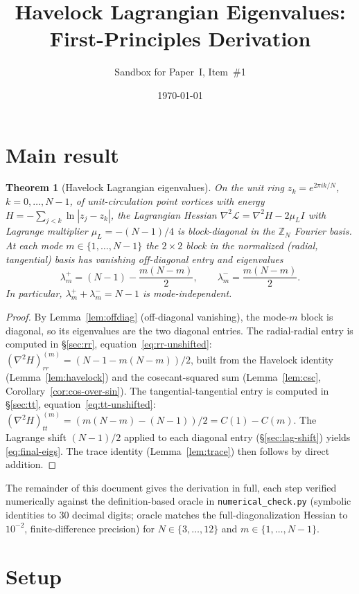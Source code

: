 \documentclass[11pt]{article}
\title{Havelock Lagrangian Eigenvalues:\\ First-Principles Derivation}
\author{Sandbox for Paper~I, Item~\#1}
\date{\today}
\newtheorem{theorem}{Theorem}
\theoremstyle{remark}
\begin{document}
\maketitle

\section*{Main result}

\begin{theorem}[Havelock Lagrangian eigenvalues]\label{thm:havelock}
On the unit ring $z_k = e^{2\pi i k / N}$, $k = 0, \ldots, N - 1$, of
unit-circulation point vortices with energy
$H = -\sum_{j<k} \ln|z_j - z_k|$, the Lagrangian Hessian
$\nabla^2 \mathcal{L} = \nabla^2 H - 2\mu_L I$ with
Lagrange multiplier $\mu_L = -(N - 1)/4$ is block-diagonal in the
$\mathbb{Z}_N$ Fourier basis. At each mode
$m \in \{1, \ldots, N-1\}$ the $2 \times 2$ block in the normalized
(radial, tangential) basis has vanishing off-diagonal entry and
eigenvalues
\[
  \lambda_m^+ = (N - 1) - \frac{m(N-m)}{2},
  \qquad
  \lambda_m^- = \frac{m(N-m)}{2}.
\]
In particular, $\lambda_m^+ + \lambda_m^- = N - 1$ is mode-independent.
\end{theorem}

\begin{proof}
By Lemma~\ref{lem:offdiag} (off-diagonal vanishing), the mode-$m$
block is diagonal, so its eigenvalues are the two diagonal entries.
The radial-radial entry is computed in \S\ref{sec:rr},
equation~\eqref{eq:rr-unshifted}: $(\nabla^2 H)_{rr}^{(m)}
= (N - 1 - m(N-m))/2$, built from the Havelock identity
(Lemma~\ref{lem:havelock}) and the cosecant-squared sum
(Lemma~\ref{lem:csc}, Corollary~\ref{cor:cos-over-sin}).
The tangential-tangential entry is computed in \S\ref{sec:tt},
equation~\eqref{eq:tt-unshifted}: $(\nabla^2 H)_{tt}^{(m)}
= (m(N-m) - (N-1))/2 = C(1) - C(m)$. The Lagrange shift
$(N-1)/2$ applied to each diagonal entry (\S\ref{sec:lag-shift})
yields \eqref{eq:final-eigs}. The trace identity
(Lemma~\ref{lem:trace}) then follows by direct addition.
\end{proof}

The remainder of this document gives the derivation in full, each step
verified numerically against the definition-based oracle in
\texttt{numerical\_check.py} (symbolic identities to 30 decimal digits;
oracle matches the full-diagonalization Hessian to $10^{-2}$,
finite-difference precision) for $N \in \{3, \ldots, 12\}$ and
$m \in \{1, \ldots, N-1\}$.

\section{Setup}\label{sec:setup}
\end{document}
